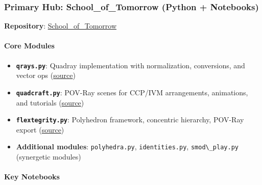 \documentclass[
  10pt,
]{article}
\newcommand{\passthrough}[1]{#1}
\providecommand{\tightlist}{%
  \setlength{\itemsep}{0pt}\setlength{\parskip}{0pt}}
\begin{document}
\hypertarget{primary-hub-school_of_tomorrow-python-notebooks}{%
\subsubsection{Primary Hub: School\_of\_Tomorrow (Python +
Notebooks)}\label{primary-hub-school_of_tomorrow-python-notebooks}}

\textbf{Repository}:
\href{https://github.com/4dsolutions/School_of_Tomorrow}{School\_of\_Tomorrow}

\hypertarget{core-modules}{%
\paragraph{Core Modules}\label{core-modules}}

\begin{itemize}
\tightlist
\item
  \textbf{\passthrough{\lstinline!qrays.py!}}: Quadray implementation
  with normalization, conversions, and vector ops
  (\href{https://github.com/4dsolutions/School_of_Tomorrow/blob/master/qrays.py}{source})
\item
  \textbf{\passthrough{\lstinline!quadcraft.py!}}: POV-Ray scenes for
  CCP/IVM arrangements, animations, and tutorials
  (\href{https://github.com/4dsolutions/School_of_Tomorrow/blob/master/quadcraft.py}{source})
\item
  \textbf{\passthrough{\lstinline!flextegrity.py!}}: Polyhedron
  framework, concentric hierarchy, POV-Ray export
  (\href{https://github.com/4dsolutions/School_of_Tomorrow/blob/master/flextegrity.py}{source})
\item
  \textbf{Additional modules}: \passthrough{\lstinline!polyhedra.py!},
  \passthrough{\lstinline!identities.py!},
  \passthrough{\lstinline!smod\_play.py!} (synergetic modules)
\end{itemize}

\hypertarget{key-notebooks}{%
\paragraph{Key Notebooks}\label{key-notebooks}}
\end{document}

